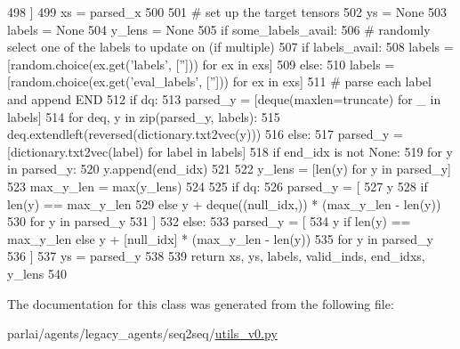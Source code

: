 \begin{DoxyCode}
498             ]
499         xs = parsed\_x
500 
501         \textcolor{comment}{# set up the target tensors}
502         ys = \textcolor{keywordtype}{None}
503         labels = \textcolor{keywordtype}{None}
504         y\_lens = \textcolor{keywordtype}{None}
505         \textcolor{keywordflow}{if} some\_labels\_avail:
506             \textcolor{comment}{# randomly select one of the labels to update on (if multiple)}
507             \textcolor{keywordflow}{if} labels\_avail:
508                 labels = [random.choice(ex.get(\textcolor{stringliteral}{'labels'}, [\textcolor{stringliteral}{''}])) \textcolor{keywordflow}{for} ex \textcolor{keywordflow}{in} exs]
509             \textcolor{keywordflow}{else}:
510                 labels = [random.choice(ex.get(\textcolor{stringliteral}{'eval\_labels'}, [\textcolor{stringliteral}{''}])) \textcolor{keywordflow}{for} ex \textcolor{keywordflow}{in} exs]
511             \textcolor{comment}{# parse each label and append END}
512             \textcolor{keywordflow}{if} dq:
513                 parsed\_y = [deque(maxlen=truncate) \textcolor{keywordflow}{for} \_ \textcolor{keywordflow}{in} labels]
514                 \textcolor{keywordflow}{for} deq, y \textcolor{keywordflow}{in} zip(parsed\_y, labels):
515                     deq.extendleft(reversed(dictionary.txt2vec(y)))
516             \textcolor{keywordflow}{else}:
517                 parsed\_y = [dictionary.txt2vec(label) \textcolor{keywordflow}{for} label \textcolor{keywordflow}{in} labels]
518             \textcolor{keywordflow}{if} end\_idx \textcolor{keywordflow}{is} \textcolor{keywordflow}{not} \textcolor{keywordtype}{None}:
519                 \textcolor{keywordflow}{for} y \textcolor{keywordflow}{in} parsed\_y:
520                     y.append(end\_idx)
521 
522             y\_lens = [len(y) \textcolor{keywordflow}{for} y \textcolor{keywordflow}{in} parsed\_y]
523             max\_y\_len = max(y\_lens)
524 
525             \textcolor{keywordflow}{if} dq:
526                 parsed\_y = [
527                     y
528                     \textcolor{keywordflow}{if} len(y) == max\_y\_len
529                     \textcolor{keywordflow}{else} y + deque((null\_idx,)) * (max\_y\_len - len(y))
530                     \textcolor{keywordflow}{for} y \textcolor{keywordflow}{in} parsed\_y
531                 ]
532             \textcolor{keywordflow}{else}:
533                 parsed\_y = [
534                     y \textcolor{keywordflow}{if} len(y) == max\_y\_len \textcolor{keywordflow}{else} y + [null\_idx] * (max\_y\_len - len(y))
535                     \textcolor{keywordflow}{for} y \textcolor{keywordflow}{in} parsed\_y
536                 ]
537             ys = parsed\_y
538 
539         \textcolor{keywordflow}{return} xs, ys, labels, valid\_inds, end\_idxs, y\_lens
540 
\end{DoxyCode}


The documentation for this class was generated from the following file\+:\begin{DoxyCompactItemize}
\item 
parlai/agents/legacy\+\_\+agents/seq2seq/\hyperlink{utils__v0_8py}{utils\+\_\+v0.\+py}\end{DoxyCompactItemize}
